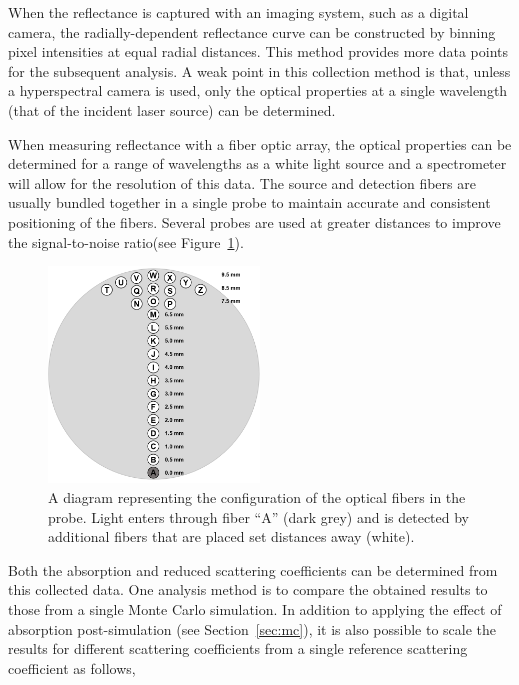 When the reflectance is captured with an imaging system, such as a digital camera, the radially-dependent reflectance curve can be constructed by binning pixel intensities at equal radial distances. This method provides more data points for the subsequent analysis. A weak point in this collection method is that, unless a hyperspectral camera is used, only the optical properties at a single wavelength (that of the incident laser source) can be determined.

When measuring reflectance with a fiber optic array, the optical properties can be determined for a range of wavelengths as a white light source and a spectrometer will allow for the resolution of this data. The source and detection fibers are usually bundled together in a single probe to maintain accurate and consistent positioning of the fibers. Several probes are used at greater distances to improve the signal-to-noise ratio(see Figure~\ref{fig:intro-srdr}).

\begin{figure}
	\centering \includegraphics[width=0.5\textwidth]{figures/intro-srdr.png}
	\caption[Probe for spatially-resolved diffuse reflectance]{\label{fig:intro-srdr}A diagram representing the configuration of the optical fibers in the probe. Light enters through fiber “A” (dark grey) and is detected by additional fibers that are placed set distances away (white).}
\end{figure}

Both the absorption and reduced scattering coefficients can be determined from this collected data. One analysis method is to compare the obtained results to those from a single Monte Carlo simulation. In addition to applying the effect of absorption post-simulation (see Section~\ref{sec:mc}), it is also possible to scale the results for different scattering coefficients from a single reference scattering coefficient as follows,\cite{Kienle1996a}

